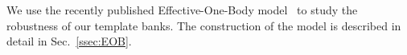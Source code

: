 We use the recently published Effective-One-Body model~\cite{BuonannoEOBv2Main}
to study the robustness of our template banks. The construction of the model 
is described in detail in Sec.~\ref{ssec:EOB}.
% 
% 
